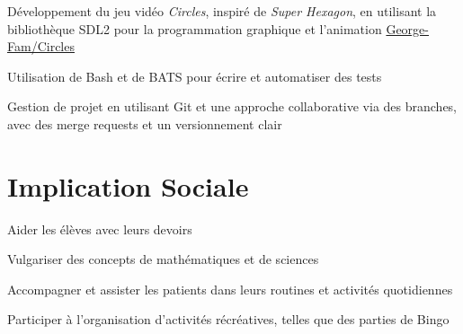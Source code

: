 \documentclass[letterpaper,10pt]{article}
\begin{document}
  \begin{resume_list}
    \item Développement du jeu vidéo \textit{Circles}, inspiré de \textit{Super Hexagon}, en utilisant la bibliothèque SDL2 pour la programmation graphique et l’animation \href{https://github.com/George-Fam/Circles}{\faGithubSquare George-Fam/Circles}
    \vspace{2pt}
    \item Utilisation de Bash et de BATS pour écrire et automatiser des tests
    \vspace{2pt}
    \item Gestion de projet en utilisant Git et une approche collaborative via des branches, avec des merge requests et un versionnement clair
  \end{resume_list}
  

  \section{Implication Sociale}

  \begin{resume_list}
    \item Aider les élèves avec leurs devoirs
    \item Vulgariser des concepts de mathématiques et de sciences
  \end{resume_list}
  
\begin{resume_list}
    \item Accompagner et assister les patients dans leurs routines et activités quotidiennes
    \item Participer à l'organisation d'activités récréatives, telles que des parties de Bingo
\end{resume_list}
\end{document}
